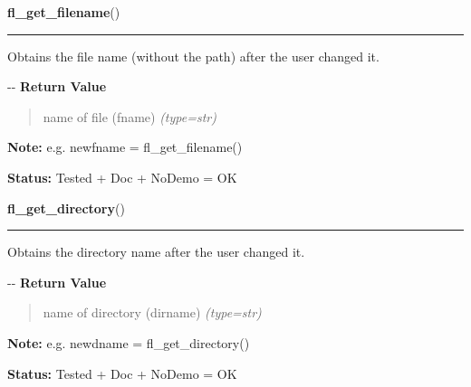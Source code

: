     \label{xformslib:flgoodies:fl_get_filename}

    \vspace{0.5ex}

\hspace{.8\funcindent}\begin{boxedminipage}{\funcwidth}

    \raggedright \textbf{fl\_get\_filename}()

    \vspace{-1.5ex}

    \rule{\textwidth}{0.5\fboxrule}
\setlength{\parskip}{2ex}

Obtains the file name (without the path) after the user changed it.

-{}-
\setlength{\parskip}{1ex}
      \textbf{Return Value}
    \vspace{-1ex}

      \begin{quote}

name of file (fname)
      {\it (type=str)}

      \end{quote}

\textbf{Note:} 
e.g. newfname = fl\_get\_filename()


\textbf{Status:} 
Tested + Doc + NoDemo = OK


    \end{boxedminipage}

    \label{xformslib:flgoodies:fl_get_directory}

    \vspace{0.5ex}

\hspace{.8\funcindent}\begin{boxedminipage}{\funcwidth}

    \raggedright \textbf{fl\_get\_directory}()

    \vspace{-1.5ex}

    \rule{\textwidth}{0.5\fboxrule}
\setlength{\parskip}{2ex}

Obtains the directory name after the user changed it.

-{}-
\setlength{\parskip}{1ex}
      \textbf{Return Value}
    \vspace{-1ex}

      \begin{quote}

name of directory (dirname)
      {\it (type=str)}

      \end{quote}

\textbf{Note:} 
e.g. newdname = fl\_get\_directory()


\textbf{Status:} 
Tested + Doc + NoDemo = OK


    \end{boxedminipage}

